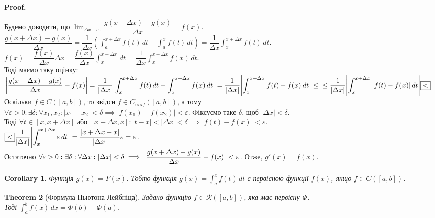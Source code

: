 \documentclass[a4paper, 10pt]{article}
\makeatletter
\def\huge{\displaystyle}
\def\qed{$\blacksquare$}
\theoremstyle{theoremdd}
\newtheorem{theorem}{Theorem}[subsection]
\theoremstyle{theoremdd}
\theoremstyle{theoremdd}
\theoremstyle{theoremdd}
\theoremstyle{theoremdd}
\theoremstyle{theoremdd}
\theoremstyle{theoremdd}
\theoremstyle{theoremdd}
\newtheorem{corollary}[theorem]{Corollary}
\renewenvironment{proof}[1][Proof.\\]{\par
\pushQED{\hfill \qed}%
\normalfont \topsep6\p@\@plus6\p@\relax
\trivlist
\item\relax
{\bfseries
#1\@addpunct{.}}\hspace\labelsep\ignorespaces
}{%
\popQED\endtrivlist\@endpefalse
}
\makeatother
\begin{document}
\begin{proof}
Будемо доводити, що $\huge\lim_{\Delta x \to 0} \dfrac{g(x+\Delta x) - g(x)}{\Delta x} = f(x)$.\\
$\dfrac{g(x+\Delta x)-g(x)}{\Delta x} = \dfrac{1}{\Delta x} \huge \left( \int_a^{x+\Delta x} f(t)\,dt - \int_a^x f(t)\,dt \right) = \dfrac{1}{\Delta x} \int_x^{x+\Delta x} f(t)\,dt$.\\
$f(x) = \dfrac{f(x)}{\Delta x} \Delta x = \dfrac{f(x)}{\Delta x} \huge\int_x^{x+\Delta x} \,dt = \dfrac{1}{\Delta x} \int_x^{x+\Delta x} f(x)\,dt$.\\
Тоді маємо таку оцінку:\\
$\huge \abs{\dfrac{g(x+\Delta x) - g(x)}{\Delta x} - f(x)} = \dfrac{1}{|\Delta x|} \abs{\int_x^{x+\Delta x} f(t)\,dt - \int_x^{x+\Delta x} f(x)\,dt} = \dfrac{1}{|\Delta x|} \abs{\int_x^{x+\Delta x} f(t)-f(x)\,dt} \leq \\ \leq \dfrac{1}{|\Delta x|} \abs{\int_x^{x+\Delta x} |f(t)-f(x)|\,dt} \boxed{<}$\\
Оскільки $f \in C([a,b])$, то звідси $f \in C_{unif}([a,b])$, а тому\\
$\forall \varepsilon > 0: \exists \delta: \forall x_1,x_2: |x_1-x_2| < \delta \implies |f(x_1)-f(x_2)| < \varepsilon$.
Фіксуємо таке $\delta$, щоб $|\Delta x| < \delta$.\\
Тоді $\forall t \in [x,x+\Delta x]$ або $[x+\Delta x,x]: |t-x| < |\Delta x| < \delta \implies |f(t)-f(x)| < \varepsilon$.\\
$\boxed{<} \dfrac{1}{|\Delta x|} \huge \abs{\int_x^{x+\Delta x} \varepsilon \,dt} = \dfrac{|x+\Delta x - x|}{|\Delta x|} \varepsilon = \varepsilon$.\\
Остаточно $\forall \varepsilon > 0: \exists \delta: \forall \Delta x: |\Delta x| < \delta \implies \abs{\dfrac{g(x+\Delta x) - g(x)}{\Delta x} - f(x)} < \varepsilon$. Отже, $g'(x) = f(x)$.
\end{proof}

\begin{corollary}
Функція $g(x) = F(x)$. Тобто функція $g(x) = \huge\int_a^x f(t)\,dt$ є первісною функції $f(x)$, якщо $f \in C([a,b])$.
\end{corollary}

\begin{theorem}[Формула Ньютона-Лейбніца]
Задано функцію $f \in \mathcal{R}([a,b])$, яка має первісну $\Phi$.\\
Тоді $\huge\int_a^b f(x)\,dx = \Phi(b) - \Phi(a)$.
\end{theorem}
\end{document}
